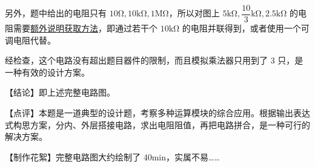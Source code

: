 \documentclass[UTF8]{ctexart}
\begin{document}
另外，题中给出的电阻只有 $\mathrm{10\Omega, 10k\Omega, 1M\Omega}$，所以对图上 $\mathrm{5k\Omega,\dfrac{10}{3}k\Omega, 2.5k\Omega}$ 的电阻需要\underline{额外说明获取方法}，即通过若干个 $10\mathrm{k\Omega}$ 的电阻并联得到，或者使用一个可调电阻代替。

经检查，这个电路没有超出题目器件的限制，而且模拟乘法器只用到了 3 只，是一种有效的设计方案。

\vspace{0.3cm}

\textcolor{cyan!80!black}{【结论】即上述完整电路图。}

\textcolor{cyan!80!black}{【点评】本题是一道典型的设计题，考察多种运算模块的综合应用。根据输出表达式构思方案，分内、外层搭接电路，求出电阻阻值，再把电路拼合，是一种可行的解决方案。}

\textcolor{cyan!80!black}{【制作花絮】完整电路图大约绘制了 40min，实属不易……}
\end{document}
